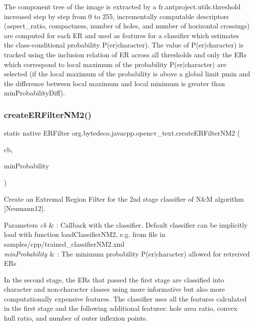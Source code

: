 The component tree of the image is extracted by a fr.antproject.utils.threshold increased step by step from 0 to 255, incrementally computable descriptors (aspect\+\_\+ratio, compactness, number of holes, and number of horizontal crossings) are computed for each ER and used as features for a classifier which estimates the class-\/conditional probability P(er$\vert$character). The value of P(er$\vert$character) is tracked using the inclusion relation of ER across all thresholds and only the E\+Rs which correspond to local maximum of the probability P(er$\vert$character) are selected (if the local maximum of the probability is above a global limit pmin and the difference between local maximum and local minimum is greater than min\+Probability\+Diff). \mbox{\label{group__text__detect_ga941eba7519bae9c44d6cbd21d21ad26e}}
\subsubsection{\texorpdfstring{create\+E\+R\+Filter\+N\+M2()}{createERFilterNM2()}}
{\footnotesize\ttfamily static native E\+R\+Filter org.\+bytedeco.\+javacpp.\+opencv\+\_\+text.\+create\+E\+R\+Filter\+N\+M2 (\begin{DoxyParamCaption}\item[{@Ptr E\+R\+Filter.\+Callback}]{cb,  }\item[{float}]{min\+Probability }\end{DoxyParamCaption})\hspace{0.3cm}{\ttfamily [static]}}



Create an Extremal Region Filter for the 2nd stage classifier of N\&M algorithm \mbox{[}Neumann12\mbox{]}. 


\begin{DoxyParams}{Parameters}
{\em cb} & \+: Callback with the classifier. Default classifier can be implicitly load with function load\+Classifier\+N\+M2, e.\+g. from file in samples/cpp/trained\+\_\+classifier\+N\+M2.\+xml \\
\hline
{\em min\+Probability} & \+: The minimum probability P(er$\vert$character) allowed for retreived ER\textquotesingle{}s \\
\hline
\end{DoxyParams}
In the second stage, the E\+Rs that passed the first stage are classified into character and non-\/character classes using more informative but also more computationally expensive features. The classifier uses all the features calculated in the first stage and the following additional features\+: hole area ratio, convex hull ratio, and number of outer inflexion points. \mbox{\label{group__text__detect_ga3198c558c08dac61bce863d430bf2da6}} 
